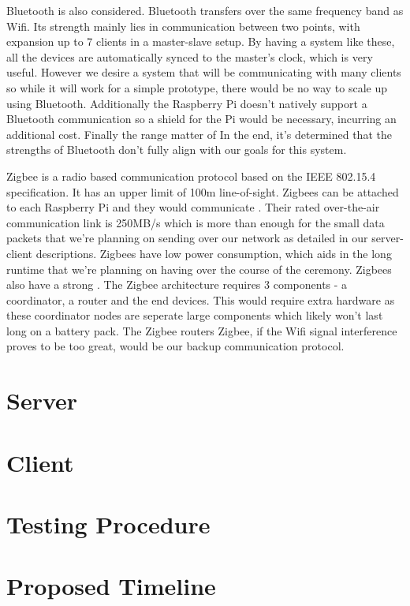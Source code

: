 \documentclass[12pt,letterpaper]{article}
\begin{document}
    Bluetooth is also considered. Bluetooth transfers over the same frequency band as Wifi. Its strength mainly lies in communication between two points, with expansion up to 7 clients in a master-slave setup. By having a system like these, all the devices are automatically synced to the master's clock, which is very useful. However we desire a system that will be communicating with many clients so while it will work for a simple prototype, there would be no way to scale up using Bluetooth. Additionally the Raspberry Pi doesn't natively support a Bluetooth communication so a shield for the Pi would be necessary, incurring an additional cost. Finally the range matter of  In the end, it's determined that the strengths of Bluetooth don't fully align with our goals for this system.

    Zigbee is a radio based communication protocol based on the IEEE 802.15.4 specification. It has an upper limit of 100m line-of-sight. Zigbees can be attached to each Raspberry Pi and they would communicate . Their rated over-the-air communication link is 250MB/s which is more than enough for the small data packets that we're planning on sending over our network as detailed in our server-client descriptions. Zigbees have low power consumption, which aids in the long runtime that we're planning on having over the course of the ceremony. Zigbees also have a strong . The Zigbee architecture requires 3 components - a coordinator, a router and the end devices. This would require extra hardware as these coordinator nodes are seperate large components which likely won't last long on a battery pack. The Zigbee routers Zigbee, if the Wifi signal interference proves to be too great, would be our backup communication protocol. 

\section {Server}

\section {Client}

\section {Testing Procedure}

\section {Proposed Timeline}
\end{document}
